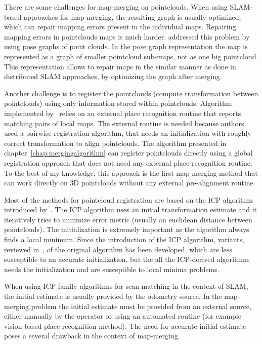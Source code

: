 There are some challenges for map-merging on pointclouds. When using \gls{SLAM}-based approaches for map-merging, the resulting graph is usually optimized, which can repair mapping errors present in the individual maps. Repairing mapping errors in pointclouds maps is much harder. \cite{bonanni2017pose} addressed this problem by using pose graphs of point clouds. In the pose graph representation the map is represented as a graph of smaller pointcloud sub-maps, not as one big pointcloud. This representation allows to repair maps in the similar manner as done in distributed \gls{SLAM} approaches, by optimizing the graph after merging.

Another challenge is to register the pointclouds (compute transformation between pointclouds) using only information stored within pointclouds. Algorithm implemented by~\cite{bonanni2017pose} relies on an external place recognition routine that reports matching pairs of local maps. The external routine is needed because authors used a pairwise registration algorithm, that needs an initialization with roughly-correct transformation to align pointclouds. The algorithm presented in chapter~\ref{chap:mergingalgorithm} can register pointclouds directly using a global registration approach that does not need any external place recognition routine. To the best of my knowledge, this approach is the first map-merging method
that can work directly on 3D pointclouds without any external pre-alignment routine.

Most of the methods for pointcloud registration are based on the \gls{ICP} algorithm introduced by~\cite{besl1992icp}. The \gls{ICP} algorithm uses an initial transformation estimate and it iteratively tries to minimize error metric (usually an euclidean distance between pointclouds). The initialization is extremely important as the algorithm always finds a local minimum. Since the introduction of the \gls{ICP} algorithm, variants, reviewed in~\cite{pomerleau2015reviewregistration}, of the original algorithm has been developed, which are less susceptible to an accurate initialization, but the all the \gls{ICP}-derived algorithms needs the initialization and are susceptible to local minima problems.

When using \gls{ICP}-family algorithms for scan matching in the context of \gls{SLAM}, the initial estimate is usually provided by the odometry source. In the map-merging problem the initial estimate must be provided from an external source, either manually by the operator or using an automated routine (for example vision-based place recognition method). The need for accurate initial estimate poses a several drawback in the context of map-merging.

